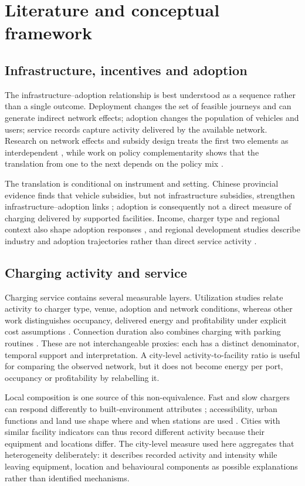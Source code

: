 \section{Literature and conceptual framework}
\subsection{Infrastructure, incentives and adoption}
The infrastructure--adoption relationship is best understood as a sequence rather than a single outcome. Deployment changes the set of feasible journeys and can generate indirect network effects; adoption changes the population of vehicles and users; service records capture activity delivered by the available network. Research on network effects and subsidy design treats the first two elements as interdependent \citep{li2017,springel2021}, while work on policy complementarity shows that the translation from one to the next depends on the policy mix \citep{burra2024}.

The translation is conditional on instrument and setting. Chinese provincial evidence finds that vehicle subsidies, but not infrastructure subsidies, strengthen infrastructure--adoption links \citep{hu2025_charging}; adoption is consequently not a direct measure of charging delivered by supported facilities. Income, charger type and regional context also shape adoption responses \citep{gifford2026,gabehart2026}, and regional development studies describe industry and adoption trajectories rather than direct service activity \citep{wang2026_regional}.

\subsection{Charging activity and service}
Charging service contains several measurable layers. Utilization studies relate activity to charger type, venue, adoption and network conditions, whereas other work distinguishes occupancy, delivered energy and profitability under explicit cost assumptions \citep{borlaug2023,hecht2022}. Connection duration also combines charging with parking routines \citep{wolbertus2018}. These are not interchangeable proxies: each has a distinct denominator, temporal support and interpretation. A city-level activity-to-facility ratio is useful for comparing the observed network, but it does not become energy per port, occupancy or profitability by relabelling it.

Local composition is one source of this non-equivalence. Fast and slow chargers can respond differently to built-environment attributes \citep{zhao2024_utilization}; accessibility, urban functions and land use shape where and when stations are used \citep{du2024_accessibility,zheng2025_landuse}. Cities with similar facility indicators can thus record different activity because their equipment and locations differ. The city-level measure used here aggregates that heterogeneity deliberately: it describes recorded activity and intensity while leaving equipment, location and behavioural components as possible explanations rather than identified mechanisms.

